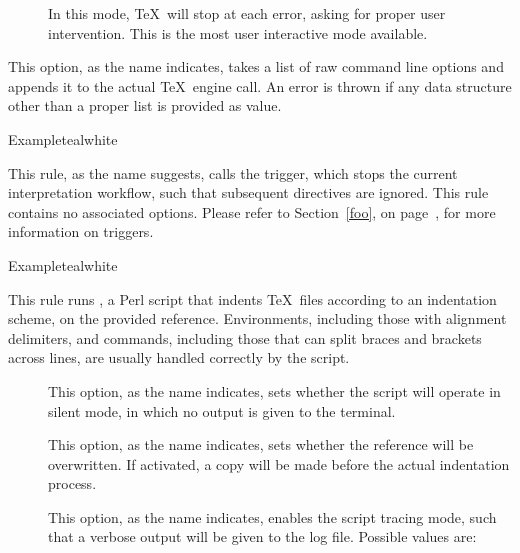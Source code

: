 \begin{description}
\begin{description}
\begin{description}
\item[] In this mode, \TeX\ will stop at each error, asking for proper user intervention. This is the most user interactive mode available.
\end{description}

\item[\abox{options}] This option, as the name indicates, takes a list of raw command line options and appends it to the actual \TeX\ engine call. An error is thrown if any data structure other than a proper list is provided as value.
\end{description}

\begin{codebox}{Example}{teal}{\icnote}{white}
\end{codebox}

\item[\rulebox{halt}{Heiko Oberdiek, Paulo Cereda}] This rule, as the name suggests, calls the  trigger, which stops the current interpretation workflow, such that subsequent directives are ignored. This rule contains no associated options. Please refer to Section~\ref{foo}, on page~\pageref{foo}, for more information on triggers.

\begin{codebox}{Example}{teal}{\icnote}{white}
\end{codebox}

\item[\rulebox{indent}{Chris Hughes, Paulo Cereda}] This rule runs , a Perl script that indents \TeX\ files according to an indentation scheme, on the provided  reference. Environments, including those with alignment delimiters, and commands, including those that can split braces and brackets across lines, are usually handled correctly by the script.

\begin{description}
\item[] This option, as the name indicates, sets whether the script will operate in silent mode, in which no output is given to the terminal.

\item[] This option, as the name indicates, sets whether the  reference will be overwritten. If activated, a copy will be made before the actual indentation process. 

\item[] This option, as the name indicates, enables the script tracing mode, such that a verbose output will be given to the  log file. Possible values are:


\end{description}
\end{description}
